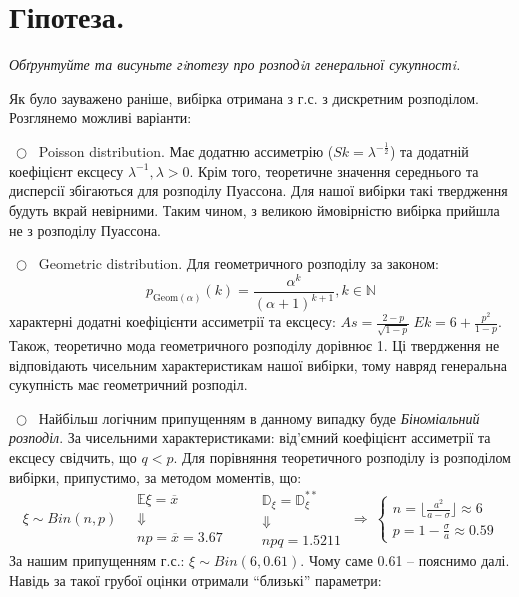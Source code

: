 \documentclass[14pt,a4paper]{scrartcl}
\theoremstyle{definition}
\theoremstyle{remark}
\theoremstyle{definition}
\theoremstyle{definition}
\begin{document}
\section{Гіпотеза.}
\textit{Обґрунтуйте та висуньте гiпотезу про розподiл генеральної сукупностi.} \par
Як було зауважено раніше, вибірка отримана з г.с. з дискретним розподілом. Розглянемо можливі варіанти:\par
  $ \  \bigcirc \ $ Poisson distribution. Має додатню ассиметрію (\( Sk = \lambda^{- \frac{1}{2}} \)) та додатній коефіцієнт ексцесу $ \lambda^{-1}, \lambda > 0$. Крім того, теоретичне значення середнього та дисперсії збігаються для розподілу Пуассона. Для нашої вибірки такі твердження будуть вкрай невірними. Таким чином, з великою ймовірністю вибірка прийшла не з розподілу Пуассона.\par
  $ \  \bigcirc \ $ Geometric distribution. Для геометричного розподілу за законом: \[ p_{
	\mathrm{Geom} (\alpha)
	} (k)  = \frac{\alpha^k}{(\alpha+1)^{k+1}}, k \in \mathbb{N} \] характерні додатні коефіцієнти ассиметрії та ексцесу: \( As = \frac{2 - p}{\sqrt{1-p}} \  Ek= 6 + \frac{p^2}{1 - p}  \). Також, теоретично мода геометричного розподілу дорівнює 1. Ці твердження не відповідають чисельним характеристикам нашої вибірки, тому навряд генеральна сукупність має геометричний розподіл. \par
  $ \  \bigcirc \ $ Найбільш логічним припущенням в данному випадку буде \textit{Біноміальний розподіл}. За чисельними характеристиками: від'ємний коефіцієнт ассиметрії та ексцесу свідчить, що $q < p$. Для порівняння теоретичного розподілу із розподілом вибірки, припустимо, за методом моментів, що:
  \[
   \xi \sim Bin(n, p) \quad \begin{gathered}
    \mathbb{E} \xi = \overline{x}\\
    \Downarrow\\
    np = \overline{x} = 3.67
   \end{gathered} \qquad \begin{gathered}
    \mathbb{D}_{\xi} = \mathbb{D}_{\xi}^{**}\\
    \Downarrow\\
     npq = 1.5211
   \end{gathered} \ \Longrightarrow \  \begin{cases}
    n = \lfloor \frac{a^2}{a-\sigma} \rfloor \approx  6 \\
    p = 1 - \frac{\sigma}{a } \approx   0.59
   \end{cases}
  \]
  За нашим припущенням г.с.: $\xi \sim Bin(6, 0.61)$. Чому саме 0.61 -- пояснимо далі.   Навідь за такої грубої оцінки отримали ``близькі'' параметри:
\end{document}
